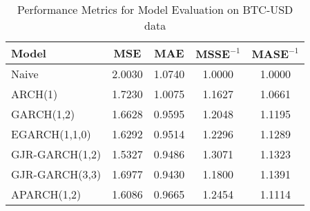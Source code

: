 

\begin{table}[ht]    
    \begin{minipage}[t]{0.3\textwidth}
        \small %
        \caption{Performance Metrics for Model Evaluation on BTC-USD data}
        \label{tab:model_metrics_A}
        \begin{tabular}{l S[table-format=1.4] S[table-format=1.4] S[table-format=1.4] S[table-format=1.4]}
            \toprule
             \textbf{Model}   & \textbf{MSE} & \textbf{MAE} & $\textbf{MSSE}^{-1}$ & $\textbf{MASE}^{-1}$ \\
            \midrule
            Naive          & 2.0030 & 1.0740 & 1.0000 & 1.0000 \\
            ARCH(1)     & 1.7230 & 1.0075 & 1.1627 & 1.0661 \\
            GARCH(1,2)     & 1.6628 & 0.9595 & 1.2048 & 1.1195 \\
            EGARCH(1,1,0)    & 1.6292 & 0.9514 & 1.2296 & 1.1289 \\
            GJR-GARCH(1,2) & 1.5327 & 0.9486 & 1.3071 & 1.1323 \\
            GJR-GARCH(3,3)    & 1.6977 & 0.9430 & 1.1800 & 1.1391 \\
            APARCH(1,2)    & 1.6086 & 0.9665 & 1.2454 & 1.1114 \\
            \bottomrule
        \end{tabular}
    \end{minipage}
    \hspace{120pt} %

\end{table}
